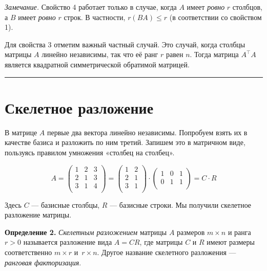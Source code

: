 \documentclass[11pt,a4paper]{article}
\renewcommand{\linethickness}{0.1ex}
\begin{document}
    \emph{Замечание.} Свойство 4 работает только в случае, когда \(A\) имеет
\emph{ровно} \(r\) столбцов, а \(B\) имеет \emph{ровно} \(r\) строк. В
частности, \(r(BA) \le r\) (в соответствии со свойством 1).

Для свойства 3 отметим важный частный случай. Это случай, когда столбцы
матрицы \(A\) линейно независимы, так что её ранг \(r\) равен \(n\).
Тогда матрица \(A^\top A\) является квадратной симметрической обратимой
матрицей.

    \begin{center}\rule{0.5\linewidth}{\linethickness}\end{center}

    \hypertarget{ux441ux43aux435ux43bux435ux442ux43dux43eux435-ux440ux430ux437ux43bux43eux436ux435ux43dux438ux435}{%
\section{Скелетное
разложение}\label{ux441ux43aux435ux43bux435ux442ux43dux43eux435-ux440ux430ux437ux43bux43eux436ux435ux43dux438ux435}}

В матрице \(A\) первые два вектора линейно независимы. Попробуем взять
их в качестве базиса и разложить по ним третий. Запишем это в матричном
виде, пользуясь правилом умножения «столбец на столбец».

\[
  A =
  \begin{pmatrix}
     1 & 2 & 3 \\
     2 & 1 & 3 \\
     3 & 1 & 4 \\
  \end{pmatrix}
  =
  \begin{pmatrix}
     1 & 2 \\
     2 & 1 \\
     3 & 1 \\
  \end{pmatrix}
  \cdot
  \begin{pmatrix}
     1 & 0 & 1 \\
     0 & 1 & 1 \\
  \end{pmatrix}
  = C \cdot R
\]

Здесь \(C\) --- базисные столбцы, \(R\) --- базисные строки. Мы получили
скелетное разложение матрицы.

\textbf{Определение 2.} \emph{Скелетным разложением} матрицы \(A\)
размеров \(m \times n\) и ранга \(r>0\) называется разложение вида
\(A = CR\), где матрицы \(C\) и \(R\) имеют размеры соответственно
\(m \times r\) и~\(r \times n\). Другое название скелетного разложения
--- \emph{ранговая факторизация}.
\end{document}

